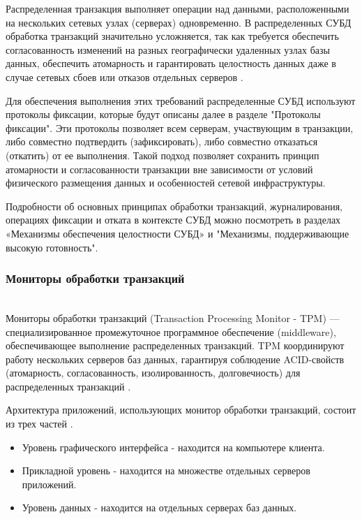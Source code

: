 Распределенная транзакция выполняет операции над данными, расположенными на нескольких сетевых узлах (серверах) одновременно. 
В распределенных СУБД обработка транзакций значительно усложняется, так как требуется обеспечить согласованность изменений на 
разных географически удаленных узлах базы данных, обеспечить атомарность и гарантировать целостность данных даже в случае сетевых 
сбоев или отказов отдельных серверов \autocite[гл. Введение]{Tanenbaum}.

Для обеспечения выполнения этих требований распределенные СУБД используют протоколы фиксации, которые будут описаны далее в разделе 
"Протоколы фиксации". Эти протоколы позволяет всем серверам, участвующим в транзакции, либо совместно подтвердить (зафиксировать), 
либо совместно отказаться (откатить) от ее выполнения. Такой подход позволяет сохранить принцип атомарности и согласованности транзакции 
вне зависимости от условий физического размещения данных и особенностей сетевой инфраструктуры.

Подробности об основных принципах обработки транзакций, журналирования, операциях фиксации и отката в контексте СУБД можно посмотреть 
в разделах «Механизмы обеспечения целостности СУБД» и "Механизмы, поддерживающие высокую готовность".

\subsubsection{Мониторы обработки транзакций}~\\

Мониторы обработки транзакций (Transaction Processing Monitor - TPM) — специализированное промежуточное программное обеспечение (middleware), 
обеспечивающее выполнение распределенных транзакций. TPM координируют работу нескольких серверов баз данных, гарантируя соблюдение ACID-свойств 
(атомарность, согласованность, изолированность, долговечность) для распределенных транзакций \autocite{TransactionMonitors}.

Архитектура приложений, использующих монитор обработки транзакций, состоит из трех частей \autocite{TPM}.

\begin{itemize}
    \item Уровень графического интерфейса - находится на компьютере клиента.
    \item Прикладной уровень - находится на множестве отдельных серверов приложений.
    \item Уровень данных - находится на отдельных серверах баз данных.
\end{itemize}

